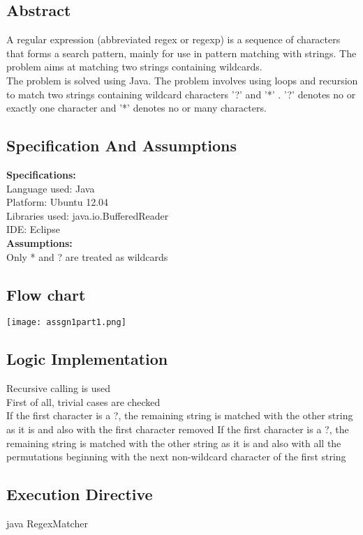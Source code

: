 \documentclass[paper=a4, fontsize=11pt]{scrartcl} %
\numberwithin{equation}{section} %
\numberwithin{figure}{section} %
\numberwithin{table}{section} %
\begin{document}
\subsection{Abstract}
A regular expression (abbreviated regex or regexp) is a sequence of characters that forms a search pattern, mainly for use in pattern matching with strings. The problem aims at matching two strings containing wildcards.\\

The problem is solved using Java. The problem involves using loops and recursion to match two strings containing wildcard characters '?' and '*' . '?' denotes no or exactly one character and '*' denotes no or many characters.

\subsection{Specification And Assumptions}
{\textbf {Specifications:}}\\
Language used: Java\\
Platform: Ubuntu 12.04\\
Libraries used: java.io.BufferedReader\\
IDE: Eclipse\\

{\textbf {Assumptions:}}\\
Only * and ? are treated as wildcards

\newpage
\subsection{Flow chart}
 {\center\texttt{[image: assgn1part1.png]}}

\subsection{Logic Implementation}
Recursive calling is used\\
First of all, trivial cases are checked\\
If the first character is a ?, the remaining string is matched with the other string as it is and also with the first character removed
If the first character is a ?, the remaining string is matched with the other string as it is and also with all the permutations beginning with the next non-wildcard character of the first string


\subsection{Execution Directive}
java RegexMatcher
\end{document}
